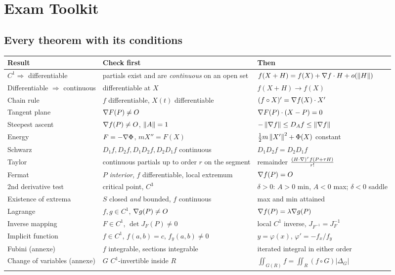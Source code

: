 \chapter{Exam Toolkit}\label{ch:toolkit}

\section{Every theorem with its conditions}

\begin{center}\small
\begin{tabularx}{\linewidth}{@{}>{\raggedright\arraybackslash}p{3.1cm} Y Y@{}}
\toprule
\textbf{Result} & \textbf{Check first} & \textbf{Then} \\ \midrule
$C^1\Rightarrow$ differentiable & partials exist and are \emph{continuous} on an open set & $f(X+H)=f(X)+\nabla f\cdot H+o(\left\lVert H\right\rVert)$\\
Differentiable $\Rightarrow$ continuous & differentiable at $X$ & $f(X+H)\to f(X)$\\
Chain rule & $f$ differentiable, $X(t)$ differentiable & $(f\circ X)'=\nabla f(X)\cdot X'$\\
Tangent plane & $\nabla F(P)\ne O$ & $\nabla F(P)\cdot(X-P)=0$\\
Steepest ascent & $\nabla f(P)\ne O$, $\left\lVert A\right\rVert=1$ & $-\left\lVert \nabla f\right\rVert\le D_Af\le\left\lVert \nabla f\right\rVert$\\
Energy & $F=-\nabla\Phi$, $mX''=F(X)$ & $\tfrac12m\left\lVert X'\right\rVert^2+\Phi(X)$ constant\\
Schwarz & $D_1f,D_2f,D_1D_2f,D_2D_1f$ continuous & $D_1D_2f=D_2D_1f$\\
Taylor & continuous partials up to order $r$ on the segment & remainder $\frac{(H\cdot\nabla)^rf(P+\tau H)}{r!}$\\
Fermat & $P$ \emph{interior}, $f$ differentiable, local extremum & $\nabla f(P)=O$\\
2nd derivative test & critical point, $C^3$ & $\delta>0$: $A>0$ min, $A<0$ max; $\delta<0$ saddle\\
Existence of extrema & $S$ closed \emph{and} bounded, $f$ continuous & max and min attained\\
Lagrange & $f,g\in C^1$, $\nabla g(P)\ne O$ & $\nabla f(P)=\lambda\nabla g(P)$\\
Inverse mapping & $F\in C^1$, $\det J_F(P)\ne0$ & local $C^1$ inverse, $J_{F^{-1}}=J_F^{-1}$\\
Implicit function & $f\in C^1$, $f(a,b)=c$, $f_y(a,b)\ne0$ & $y=\varphi(x)$, $\varphi'=-f_x/f_y$\\
Fubini (annexe) & $f$ integrable, sections integrable & iterated integral in either order\\
Change of variables (annexe) & $G$ $C^1$-invertible inside $R$ & $\iint_{G(R)}f=\iint_R(f\circ G)|\Delta_G|$\\
\bottomrule
\end{tabularx}
\end{center}

